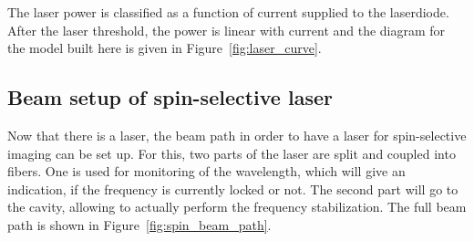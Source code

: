 The laser power is classified as a function of current supplied to the laserdiode. After the laser threshold, the power is linear with current and the diagram for the model built here is given in Figure~\ref{fig:laser_curve}.


\begin{figure}[t]%
\end{figure}

\subsection{Beam setup of spin-selective laser}

Now that there is a laser, the beam path in order to have a laser for spin-selective imaging can be set up. For this, two parts of the laser are split and coupled into fibers. One is used for monitoring of the wavelength, which will give an indication, if the frequency is currently locked or not. The second part will go to the cavity, allowing to actually perform the frequency stabilization. The full beam path is shown in Figure~\ref{fig:spin_beam_path}.

\begin{figure}[t]%
\end{figure}

